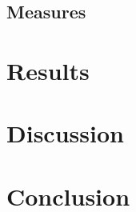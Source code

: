 \documentclass[smallextended]{svjour3}
\begin{document}
\subsection{Measures}
\section{Results}
%



\section{Discussion}
\section{Conclusion}
\end{document}

